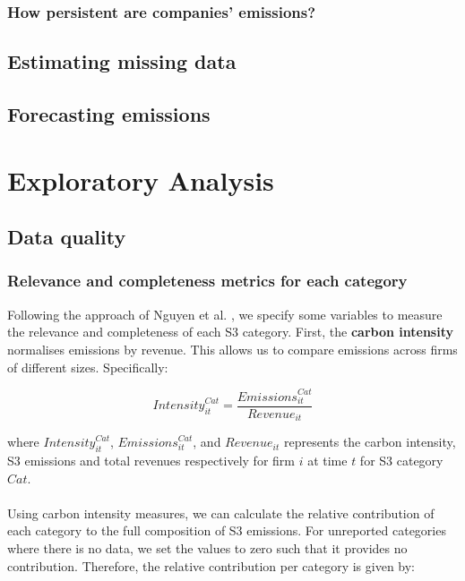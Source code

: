 \documentclass[12pt,twoside]{report}
\begin{document}
\subsection{How persistent are companies' emissions?}

\section{Estimating missing data}

\section{Forecasting emissions}


\chapter{Exploratory Analysis}\label{sec:ExploratoryAnalysis}


\section{Data quality}
\subsection{Relevance and completeness metrics for each category}\label{sec:RelevanceCompletenessMetrics}

Following the approach of Nguyen et al. \cite{Nguyenetal2023}, we specify some variables to measure the relevance and completeness of each S3 category. First, the \textbf{carbon intensity} normalises emissions by revenue. This allows us to compare emissions across firms of different sizes. Specifically:

\begin{equation}
    \mathit{Intensity}_{it}^{Cat} = \frac{\mathit{Emissions}_{it}^{Cat}}{\mathit{Revenue}_{it}}
\end{equation}

where $\mathit{Intensity}_{it}^{Cat}$, $\mathit{Emissions}_{it}^{Cat}$, and $\mathit{Revenue}_{it}$ represents the carbon intensity, S3 emissions and total revenues respectively for firm $i$ at time $t$ for S3 category $\mathit{Cat}$.
\\\\
Using carbon intensity measures, we can calculate the relative contribution of each category to the full composition of S3 emissions. For unreported categories where there is no data, we set the values to zero such that it provides no contribution. Therefore, the relative contribution per category is given by:
\end{document}
